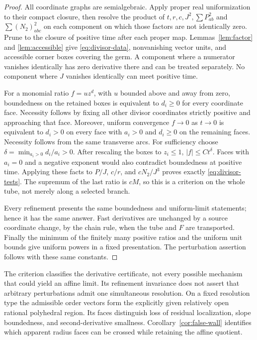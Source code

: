 \begin{proof}
All coordinate graphs are semialgebraic. Apply proper real uniformization to
their compact closure, then resolve the product of $t,r,c,J^2,\sum P_{ab}^2$
and $\sum(N_2)_{abc}^2$ on each component on which those factors are not
identically zero. Prune to the closure of positive time after each proper
map. Lemmas~\ref{lem:factor} and \ref{lem:accessible} give
\eqref{eq:divisor-data}, nonvanishing vector units, and accessible corner
boxes covering the germ. A component where a numerator vanishes identically
has zero derivative there and can be treated separately. No component where
$J$ vanishes identically can meet positive time.

For a monomial ratio $f=u z^d$, with $u$ bounded above and away from zero,
boundedness on the retained boxes is equivalent to $d_i\ge0$ for every
coordinate face. Necessity follows by fixing all other divisor coordinates
strictly positive and approaching that face. Moreover, uniform convergence
$f\to0$ as $t\to0$ is equivalent to $d_i>0$ on every face with $a_i>0$
and $d_i\ge0$ on the remaining faces. Necessity follows from the same
transverse arcs. For sufficiency choose
$\delta=\min_{a_i>0}d_i/a_i>0$. After rescaling the boxes to $z_i\le1$,
$|f|\le C t^\delta$. Faces with $a_i=0$ and a negative exponent would also
contradict boundedness at positive time. Applying these facts to $P/J$,
$c/r$, and $cN_2/J^3$ proves exactly \eqref{eq:divisor-tests}.
The supremum of the last ratio is $cM$, so this is a criterion on the whole
tube, not merely along a selected branch.

Every refinement presents the same boundedness and uniform-limit statements;
hence it has the same answer. Fast derivatives are unchanged by a source
coordinate change, by the chain rule, when the tube and $F$ are transported.
Finally the minimum of the finitely many positive ratios and the uniform
unit bounds give uniform powers in a fixed presentation. The perturbation
assertion follows with these same constants.
\end{proof}
The criterion classifies the derivative certificate, not every possible
mechanism that could yield an affine limit. Its refinement invariance does
not assert that arbitrary perturbations admit one simultaneous resolution.
On a fixed resolution type the admissible order vectors form the explicitly
given relatively open rational polyhedral region. Its faces distinguish
loss of residual localization, slope boundedness, and second-derivative
smallness. Corollary~\ref{cor:false-wall} identifies which apparent radius
faces can be crossed while retaining the affine quotient.

